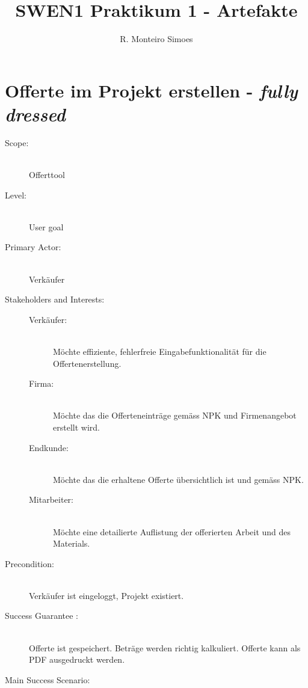 \documentclass[journal]{combine}
\begin{document}
	
	\title{SWEN1 Praktikum 1 - Artefakte}
	\author{ R. Monteiro Simoes}
	\maketitle

	\newpage

	\tableofcontents

	\newpage
	
	\section{Offerte im Projekt erstellen - \emph{fully dressed}}
	
	\begin{description}
		\item[Scope:] \hfill  \\Offerttool
		\item[Level:] \hfill \\User goal
		\item[Primary Actor:] \hfill \\Verkäufer
		\item[Stakeholders and Interests:] \hfill 
		\begin{description}
			\item[Verkäufer:]\hfill \\Möchte effiziente, fehlerfreie Eingabefunktionalität 
			für die Offertenerstellung.
			\item[Firma:]\hfill \\Möchte das die Offerteneinträge gemäss 
			NPK und Firmenangebot erstellt wird.
			\item[Endkunde:]\hfill \\Möchte das die erhaltene Offerte 
			übersichtlich ist und gemäss NPK.
			\item[Mitarbeiter:]\hfill \\Möchte eine detailierte Auflistung der
			offerierten Arbeit und des Materials.  
		\end{description}
		\item[Precondition:] \hfill \\Verkäufer ist eingeloggt, Projekt existiert. 
		\item[Success Guarantee :] \hfill \\Offerte ist gespeichert. Beträge
		werden richtig kalkuliert. Offerte kann als PDF ausgedruckt werden. 
		\item[Main Success Scenario:] \hfill  
		\begin{enumerate}

\end{enumerate}
\end{description}
\end{document}
